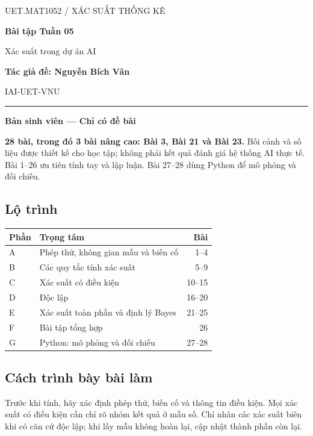 \documentclass[11pt,a4paper]{article}
\begin{document}
\thispagestyle{empty}
{\small\sffamily\color{Teal}UET.MAT1052 \quad / \quad XÁC SUẤT THỐNG KÊ}
\par\vspace{8mm}
{\Huge\sffamily\bfseries\color{Ink}Bài tập Tuần 05}
\par\vspace{3mm}
{\LARGE\sffamily\color{Ink}Xác suất trong dự án AI}
\par\vspace{6mm}
\textbf{Tác giả đề: Nguyễn Bích Vân}\par
IAI-UET-VNU
\par\vspace{3mm}\textcolor{Teal}{\rule{\linewidth}{1pt}}\par
{\large\sffamily\bfseries Bản sinh viên --- Chỉ có đề bài}
\par\vspace{3mm}
\begin{infobox}
\textbf{28 bài, trong đó 3 bài nâng cao: Bài 3, Bài 21 và Bài 23.}
Bối cảnh và số liệu được thiết kế cho học tập; không phải kết quả đánh giá hệ thống AI thực tế. Bài 1--26 ưu tiên tính tay và lập luận. Bài 27--28 dùng Python để mô phỏng và đối chiếu.
\end{infobox}
\subsection*{Lộ trình}
\begin{tabularx}{\linewidth}{@{}p{11mm}Xr@{}}\toprule
Phần & Trọng tâm & Bài\\\midrule
A & Phép thử, không gian mẫu và biến cố & 1--4\\
B & Các quy tắc tính xác suất & 5--9\\
C & Xác suất có điều kiện & 10--15\\
D & Độc lập & 16--20\\
E & Xác suất toàn phần và định lý Bayes & 21--25\\
F & Bài tập tổng hợp & 26\\
G & Python: mô phỏng và đối chiếu & 27--28\\\bottomrule
\end{tabularx}
\subsection*{Cách trình bày bài làm}
Trước khi tính, hãy xác định phép thử, biến cố và thông tin điều kiện. Mọi xác suất có điều kiện cần chỉ rõ nhóm kết quả ở mẫu số. Chỉ nhân các xác suất biên khi có căn cứ độc lập; khi lấy mẫu không hoàn lại, cập nhật thành phần còn lại.
\end{document}
